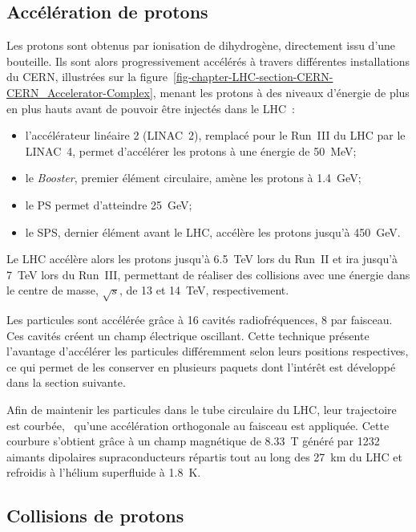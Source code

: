 \subsection{Accélération de protons}\label{chapter-LHC-section-LHC-subsec-pp_acceleration}
Les protons sont obtenus par ionisation de dihydrogène, directement issu d'une bouteille.
Ils sont alors progressivement accélérés à travers différentes installations du CERN, illustrées sur la figure~\ref{fig-chapter-LHC-section-CERN-CERN_Accelerator-Complex}, menant les protons à des niveaux d'énergie de plus en plus hauts avant de pouvoir être injectés dans le LHC~\cite{LHC_paper3}:
\begin{itemize}
\item l'accélérateur linéaire 2 (LINAC~2), remplacé pour le Run~III du LHC par le LINAC~4, permet d'accélérer les protons à une énergie de \SI{50}{\MeV};
\item le \emph{Booster}, premier élément circulaire, amène les protons à \SI{1.4}{\GeV};
\item le PS permet d'atteindre \SI{25}{\GeV};
\item le SPS, dernier élément avant le LHC, accélère les protons jusqu'à \SI{450}{\GeV}.
\end{itemize}
Le LHC accélère alors les protons jusqu'à \SI{6.5}{\TeV} lors du Run~II et ira jusqu'à \SI{7}{\TeV} lors du Run~III, permettant de réaliser des collisions avec une énergie dans le centre de masse, $\sqrt{s}$, de \num{13} et \SI{14}{\TeV}, respectivement.
\par Les particules sont accélérée grâce à 16 cavités radiofréquences, 8 par faisceau.
Ces cavités créent un champ électrique oscillant.
Cette technique présente l'avantage d'accélérer les particules différemment selon leurs positions respectives, ce qui permet de les conserver en plusieurs paquets dont l'intérêt est développé dans la section suivante.
\par Afin de maintenir les particules dans le tube circulaire du LHC, leur trajectoire est courbée, \ie\ qu'une accélération orthogonale au faisceau est appliquée.
Cette courbure s'obtient grâce à un champ magnétique de \SI{8.33}{\tesla} généré par 1232 aimants dipolaires supraconducteurs répartis tout au long des \SI{27}{\kilo\meter} du LHC et refroidis à l'hélium superfluide à \SI{1.8}{\kelvin}.
\subsection{Collisions de protons}\label{chapter-LHC-section-LHC-subsec-pp_collisions}
